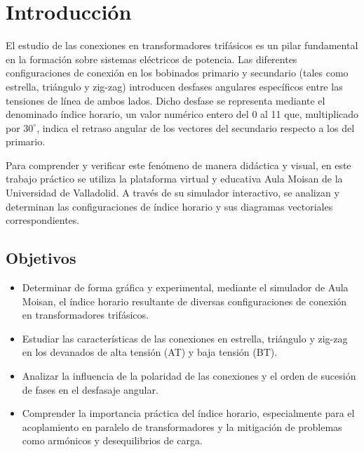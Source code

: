 \chapter{Introducción}

El estudio de las conexiones en transformadores trifásicos es un pilar fundamental en la formación sobre sistemas
eléctricos de potencia. Las diferentes configuraciones de conexión en los bobinados primario y secundario (tales como
estrella, triángulo y zig-zag) introducen desfases angulares específicos entre las tensiones de línea de ambos lados.
Dicho desfase se representa mediante el denominado índice horario, un valor numérico entero del 0 al 11 que, multiplicado
por $30^\circ$, indica el retraso angular de los vectores del secundario respecto a los del primario.

Para comprender y verificar este fenómeno de manera didáctica y visual, en este trabajo práctico se utiliza la plataforma
virtual y educativa Aula Moisan de la Universidad de Valladolid. A través de su simulador interactivo, se analizan y
determinan las configuraciones de índice horario y sus diagramas vectoriales correspondientes.

\section{Objetivos}
\begin{itemize}
    \item Determinar de forma gráfica y experimental, mediante el simulador de Aula Moisan, el índice horario resultante
    de diversas configuraciones de conexión en transformadores trifásicos.
    \item Estudiar las características de las conexiones en estrella, triángulo y zig-zag en los devanados de alta
    tensión (AT) y baja tensión (BT).
    \item Analizar la influencia de la polaridad de las conexiones y el orden de sucesión de fases en el desfasaje angular.
    \item Comprender la importancia práctica del índice horario, especialmente para el acoplamiento en paralelo de
    transformadores y la mitigación de problemas como armónicos y desequilibrios de carga.
\end{itemize}
